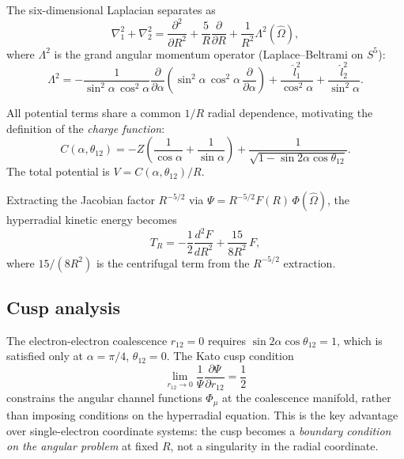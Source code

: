\documentclass[aps,pra,twocolumn,superscriptaddress,longbibliography]{revtex4-2}
\begin{document}
The six-dimensional Laplacian separates as~\cite{Lin1995}
\begin{equation}
  \nabla_1^2 + \nabla_2^2 = \frac{\partial^2}{\partial R^2}
  + \frac{5}{R}\frac{\partial}{\partial R}
  + \frac{1}{R^2}\Lambda^2(\hat{\Omega}),
  \label{eq:laplacian}
\end{equation}
where $\Lambda^2$ is the grand angular momentum operator
(Laplace--Beltrami on $S^5$):
\begin{equation}
  \Lambda^2 = -\frac{1}{\sin^2\!\alpha\,\cos^2\!\alpha}
  \frac{\partial}{\partial\alpha}
  \!\left(\sin^2\!\alpha\,\cos^2\!\alpha\,
  \frac{\partial}{\partial\alpha}\right)
  + \frac{\hat{l}_1^2}{\cos^2\!\alpha}
  + \frac{\hat{l}_2^2}{\sin^2\!\alpha}.
  \label{eq:Lambda2}
\end{equation}

All potential terms share a common $1/R$ radial dependence,
motivating the definition of the \emph{charge function}:
\begin{equation}
  C(\alpha, \theta_{12}) = -Z\!\left(\frac{1}{\cos\alpha}
  + \frac{1}{\sin\alpha}\right)
  + \frac{1}{\sqrt{1 - \sin 2\alpha\cos\theta_{12}}}.
  \label{eq:charge_function}
\end{equation}
The total potential is $V = C(\alpha, \theta_{12})/R$.

Extracting the Jacobian factor $R^{-5/2}$ via $\Psi = R^{-5/2}
F(R)\,\Phi(\hat{\Omega})$, the hyperradial kinetic energy
becomes~\cite{Macek1968}
\begin{equation}
  T_R = -\frac{1}{2}\frac{d^2F}{dR^2}
  + \frac{15}{8R^2}\,F,
  \label{eq:T_R}
\end{equation}
where $15/(8R^2)$ is the centrifugal term from the $R^{-5/2}$
extraction.

\subsection{Cusp analysis}

The electron-electron coalescence $r_{12} = 0$ requires
$\sin 2\alpha\cos\theta_{12} = 1$, which is satisfied only at
$\alpha = \pi/4$, $\theta_{12} = 0$.  The Kato cusp
condition~\cite{Kato1957}
\begin{equation}
  \lim_{r_{12}\to 0}\frac{1}{\Psi}
  \frac{\partial\Psi}{\partial r_{12}} = \frac{1}{2}
  \label{eq:kato}
\end{equation}
constrains the angular channel functions $\Phi_\mu$ at the
coalescence manifold, rather than imposing conditions on the
hyperradial equation.  This is the key advantage over single-electron
coordinate systems: the cusp becomes a \emph{boundary condition on
the angular problem} at fixed $R$, not a singularity in the radial
coordinate.
\end{document}
